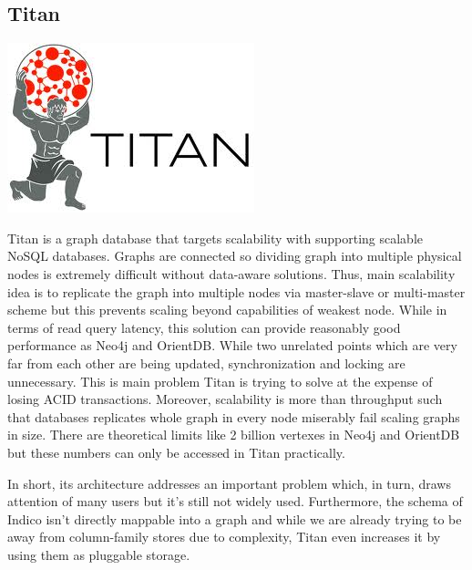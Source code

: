 \subsection{Titan}

\vspace{-1.15cm} \hspace{3cm} \includegraphics[scale=0.2]{3/figures/titan.jpg}

Titan is a graph database that targets scalability with supporting scalable NoSQL databases. Graphs are connected so dividing graph into multiple physical nodes is extremely difficult without data-aware solutions. Thus, main scalability idea is to replicate the graph into multiple nodes via master-slave or multi-master scheme but this prevents scaling beyond capabilities of weakest node. While in terms of read query latency, this solution can provide reasonably good performance as Neo4j and OrientDB. While two unrelated points which are very far from each other are being updated, synchronization and locking are unnecessary. This is main problem Titan is trying to solve at the expense of losing ACID transactions. Moreover, scalability is more than throughput such that databases replicates whole graph in every node miserably fail scaling graphs in size. There are theoretical limits like 2 billion vertexes in Neo4j and OrientDB but these numbers can only be accessed in Titan practically.

In short, its architecture addresses an important problem which, in turn, draws attention of many users but it's still not widely used. Furthermore, the schema of Indico isn't directly mappable into a graph and while we are already trying to be away from column-family stores due to complexity, Titan even increases it by using them as pluggable storage.

